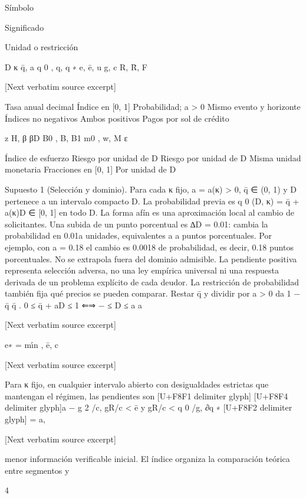 \documentclass[10pt]{article}
\begin{document}
\begin{ReviewVerbatim}

Símbolo

Signiﬁcado

Unidad o restricción

D
κ
q̄, a
q 0 , q, q ∗
e, ē, u
g, c
R, R̄, F


[Next verbatim source excerpt]


Tasa anual decimal
Índice en [0, 1]
Probabilidad; a > 0
Mismo evento y horizonte
Índices no negativos
Ambos positivos
Pagos por sol de crédito

z
H, β
βD
B0 , B, B1
m0 , w, M
ε

Índice de esfuerzo
Riesgo por unidad de D
Riesgo por unidad de D
Misma unidad monetaria
Fracciones en [0, 1]
Por unidad de D

Supuesto 1 (Selección y dominio). Para cada κ ﬁjo, a = a(κ) > 0, q̄ ∈ (0, 1) y D pertenece a un
intervalo compacto D. La probabilidad previa es q 0 (D, κ) = q̄ + a(κ)D ∈ [0, 1] en todo D.
La forma afín es una aproximación local al cambio de solicitantes. Una subida de un punto
porcentual es ∆D = 0.01: cambia la probabilidad en 0.01a unidades, equivalentes a a puntos porcentuales. Por ejemplo, con a = 0.18 el cambio es 0.0018 de probabilidad, es decir, 0.18 puntos
porcentuales. No se extrapola fuera del dominio admisible. La pendiente positiva representa selección adversa, no una ley empírica universal ni una respuesta derivada de un problema explícito de
cada deudor.
La restricción de probabilidad también ﬁja qué precios se pueden comparar. Restar q̄ y dividir
por a > 0 da
1 − q̄
q̄
.
0 ≤ q̄ + aD ≤ 1 ⇐⇒ − ≤ D ≤
a
a

[Next verbatim source excerpt]

e∗ = mı́n
, ē,
c

[Next verbatim source excerpt]

Para κ ﬁjo, en cualquier intervalo abierto con desigualdades estrictas que mantengan el régimen,
las pendientes son
[U+F8F1 delimiter glyph]
[U+F8F4 delimiter glyph]a − g 2 /c, gR/c < ē y gR/c < q 0 /g,
∂q ∗ [U+F8F2 delimiter glyph]
= a,

[Next verbatim source excerpt]

menor información veriﬁcable inicial. El índice organiza la comparación teórica entre segmentos y

4



\end{ReviewVerbatim}
\end{document}
